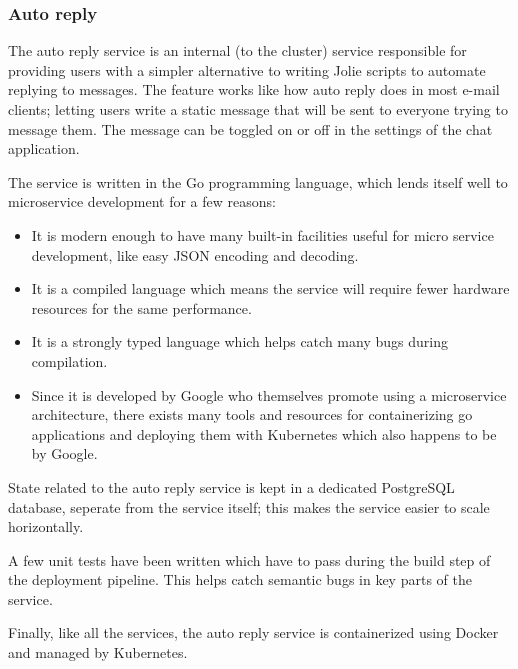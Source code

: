 \subsubsection{Auto reply}
The auto reply service is an internal (to the cluster) service responsible for providing users with a simpler alternative to writing Jolie scripts to automate replying to messages. The feature works like how auto reply does in most e-mail clients; letting users write a static message that will be sent to everyone trying to message them. The message can be toggled on or off in the settings of the chat application.

The service is written in the Go programming language, which lends itself well to microservice development for a few reasons:

\begin{itemize}
	\item It is modern enough to have many built-in facilities useful for micro service development, like easy JSON encoding and decoding.
	\item It is a compiled language which means the service will require fewer hardware resources for the same performance.
	\item It is a strongly typed language which helps catch many bugs during compilation.
	\item Since it is developed by Google who themselves promote using a microservice architecture\cite{googlePromoteMicroservices}, there exists many tools and resources for containerizing go applications and deploying them with Kubernetes which also happens to be by Google.
\end{itemize}

State related to the auto reply service is kept in a dedicated PostgreSQL database, seperate from the service itself; this makes the service easier to scale horizontally.\cite{xenonStateless}

A few unit tests have been written which have to pass during the build step of the deployment pipeline. This helps catch semantic bugs in key parts of the service.

Finally, like all the services, the auto reply service is containerized using Docker and managed by Kubernetes.

